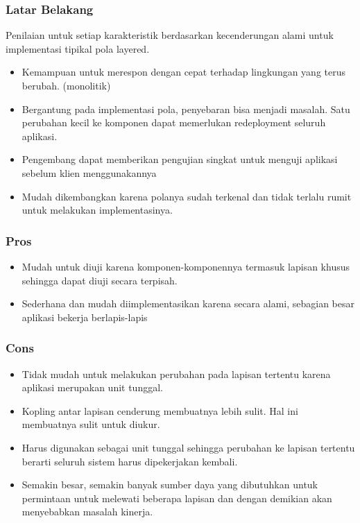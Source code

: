 \documentclass{beamer}
\begin{document}
\begin{frame}
\frametitle{Latar Belakang}
Penilaian untuk setiap karakteristik berdasarkan kecenderungan alami untuk implementasi tipikal pola layered.
\begin{itemize}
	\item Kemampuan untuk merespon dengan cepat terhadap lingkungan yang terus berubah. (monolitik)
	\item Bergantung pada implementasi pola, penyebaran bisa menjadi masalah. Satu perubahan kecil ke komponen dapat memerlukan redeployment seluruh aplikasi.
	\item Pengembang dapat memberikan pengujian singkat untuk menguji aplikasi sebelum klien menggunakannya
	\item Mudah dikembangkan karena polanya sudah terkenal dan tidak terlalu rumit untuk melakukan implementasinya.
\end{itemize}
\end{frame}

\begin{frame}
\frametitle{Pros}
\begin{itemize}
	\item Mudah untuk diuji karena komponen-komponennya termasuk lapisan khusus sehingga dapat diuji secara terpisah.
	\item Sederhana dan mudah diimplementasikan karena secara alami, sebagian besar aplikasi bekerja berlapis-lapis
\end{itemize}
\end{frame}

\begin{frame}
\frametitle{Cons}
\begin{itemize}
	\item Tidak mudah untuk melakukan perubahan pada lapisan tertentu karena aplikasi merupakan unit tunggal.
	\item Kopling antar lapisan cenderung membuatnya lebih sulit. Hal ini membuatnya sulit untuk diukur.
	\item Harus digunakan sebagai unit tunggal sehingga perubahan ke lapisan tertentu berarti seluruh sistem harus dipekerjakan kembali.
	\item Semakin besar, semakin banyak sumber daya yang dibutuhkan untuk permintaan untuk melewati beberapa lapisan dan dengan demikian akan menyebabkan masalah kinerja.
\end{itemize}
\end{frame}
\end{document}
